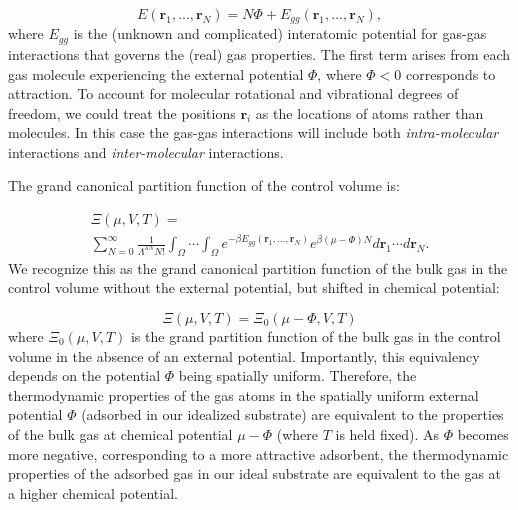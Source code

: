 \documentclass[twoside,twocolumn,9pt]{article}
\newcommand{\rvec}{\mathbf{r}}
\newcommand\V{\Phi}
\begin{document}
\begin{equation} E(\rvec_1,...,\rvec_N) = N\V +
E_{gg}(\rvec_1,...,\rvec_N),
\end{equation}
where $E_{gg}$ is the (unknown and complicated) interatomic potential for
gas-gas interactions that governs the (real) gas properties. The first term
arises from each gas molecule experiencing the external potential $\V$, where
$\V < 0$ corresponds to attraction. To account for molecular rotational and
vibrational degrees of freedom, we could treat the positions $\rvec_i$ as the
locations of atoms rather than molecules. In this case the gas-gas interactions
will include both \emph{intra-molecular} interactions and
\emph{inter-molecular} interactions.

The grand canonical partition function of the control volume is:

\begin{multline}
    \Xi(\mu, V, T)= \\ \displaystyle \sum_{N=0}^\infty \frac{1}{\Lambda^{3N}N!} \int_{\Omega} \cdots \int_{\Omega} e^{-\beta E_{gg}(\rvec_1, ..., \rvec_N)} e^{\beta (\mu - \V) N} d\rvec_1 \cdots d\rvec_N.
    \label{eq:gcpf}
\end{multline}
We recognize this as the grand canonical partition function of the bulk gas in
the control volume without the external potential, but shifted in chemical
potential:

\begin{equation}
    \Xi(\mu, V, T)=\Xi_0(\mu - \V, V, T)
    \label{eq:xi_vs_xi0}
\end{equation}
where $\Xi_0(\mu, V, T)$ is the grand partition function of the bulk
gas in the control volume in the absence of an external potential. Importantly,
this equivalency depends on the potential $\V$ being spatially uniform.
Therefore, the thermodynamic properties of the gas atoms in the spatially
uniform external potential $\V$ (adsorbed in our idealized substrate)
are equivalent to the properties of the bulk gas at chemical potential $\mu-\V$
(where $T$ is held fixed). As $\V$ becomes more negative, corresponding to a
more attractive adsorbent, the thermodynamic properties of the adsorbed gas in
our ideal substrate are equivalent to the gas at a higher chemical potential.
\end{document}
